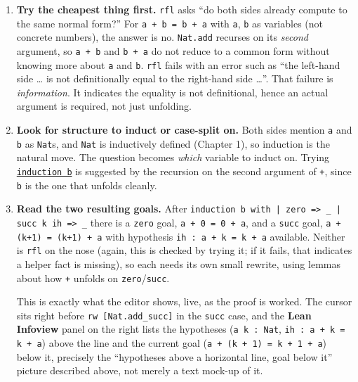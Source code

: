 \begin{enumerate}
\def\labelenumi{\arabic{enumi}.}
\item
  \textbf{Try the cheapest thing first.} \texttt{rfl} asks ``do both sides already compute to the same normal form?'' For \texttt{a + b = b + a} with \texttt{a}, \texttt{b} as variables (not concrete numbers), the answer is no. \texttt{Nat.add} recurses on its \emph{second} argument, so \texttt{a + b} and \texttt{b + a} do not reduce to a common form without knowing more about \texttt{a} and \texttt{b}. \texttt{rfl} fails with an error such as ``the left-hand side \ldots{} is not definitionally equal to the right-hand side \ldots{}''. That failure is \emph{information}. It indicates the equality is not definitional, hence an actual argument is required, not just unfolding.
\item
  \textbf{Look for structure to induct or case-split on.} Both sides mention \texttt{a} and \texttt{b} as \texttt{Nat}s, and \texttt{Nat} is inductively defined (Chapter 1), so induction is the natural move. The question becomes \emph{which} variable to induct on. Trying \href{https://lean-lang.org/doc/reference/latest/Tactic-Proofs/Tactic-Reference/}{\texttt{induction b}} is suggested by the recursion on the second argument of \texttt{+}, since \texttt{b} is the one that unfolds cleanly.
\item
  \textbf{Read the two resulting goals.} After \texttt{induction b with | zero => \_\allowbreak{} | succ k ih => \_\allowbreak{}} there is a \texttt{zero} goal, \texttt{a + 0 = 0 + a}, and a \texttt{succ} goal, \texttt{a + (k+1) = (k+1) + a} with hypothesis \texttt{ih : a + k = k + a} available. Neither is \texttt{rfl} on the nose (again, this is checked by trying it; if it fails, that indicates a helper fact is missing), so each needs its own small rewrite, using lemmas about how \texttt{+} unfolds on \texttt{zero}/\texttt{succ}.

  This is exactly what the editor shows, live, as the proof is worked. The cursor sits right before \texttt{rw [Nat.add\_\allowbreak{}succ]} in the \texttt{succ} case, and the \textbf{Lean Infoview} panel on the right lists the hypotheses (\texttt{a k : Nat}, \texttt{ih : a + k = k + a}) above the line and the current goal (\texttt{a + (k + 1) = k + 1 + a}) below it, precisely the ``hypotheses above a horizontal line, goal below it'' picture described above, not merely a text mock-up of it.


\end{enumerate}
